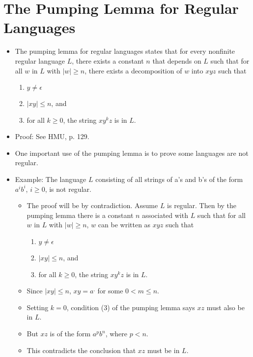 \documentclass[]{article}
\begin{document}
\section{The Pumping Lemma for Regular Languages}
  \begin{itemize}
    \item The pumping lemma for regular languages states that for every
    nonfinite regular language $L$, there exists a constant $n$ that depends on
    $L$ such that for all $w$ in $L$ with $|w| \geq n$, there exists a
    decomposition of $w$ into $xyz$ such that
      \begin{enumerate}
        \item $y \neq \epsilon$
        \item $|xy| \leq n$, and
        \item for all $k \geq 0$, the string $xy^kz$ is in $L$.
      \end{enumerate}
    \item Proof: See HMU, p. 129.
    \item One important use of the pumping lemma is to prove some languages are
    not regular.
    \item Example: The language $L$ consisting of all strings of a's and b's of
    the form $a^ib^i$, $i \geq 0$, is not regular.
      \begin{itemize}
        \item The proof will be by contradiction. Assume $L$ is regular. Then by
        the pumping lemma there is a constant $n$ associated with $L$ such that
        for all $w$ in $L$ with $|w| \geq n$, $w$ can be written as $xyz$ such
        that
          \begin{enumerate}
            \item $y \neq \epsilon$
            \item $|xy| \leq n$, and
            \item for all $k \geq 0$, the string $xy^kz$ is in $L$.
          \end{enumerate}
        \item Since $|xy| \leq n$, $xy = a^,$ for some $0 < m \leq n$.
        \item Setting $k = 0$, condition (3) of the pumping lemma says $xz$ must
        also be in $L$.
        \item But $xz$ is of the form $a^pb^n$, where $p < n$.
        \item This contradicts the conclusion that $xz$ must be in $L$.
      \end{itemize}
  \end{itemize}
\end{document}
